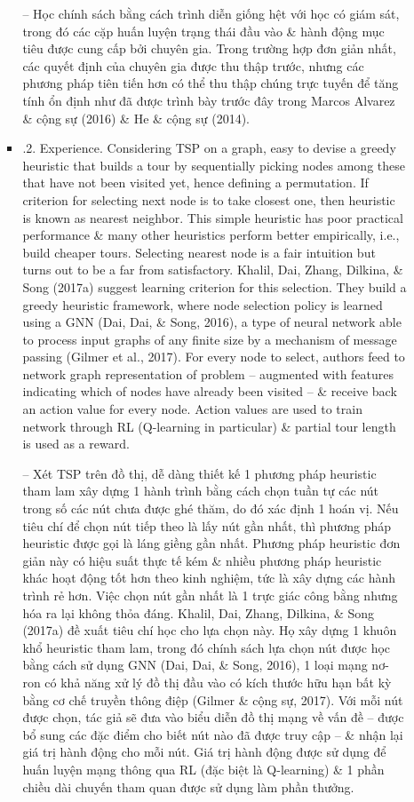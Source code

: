 \documentclass{article}
\begin{document}
\begin{itemize}
\begin{itemize}
\begin{itemize}
            -- Học chính sách bằng cách trình diễn giống hệt với học có giám sát, trong đó các cặp huấn luyện trạng thái đầu vào \& hành động mục tiêu được cung cấp bởi chuyên gia. Trong trường hợp đơn giản nhất, các quyết định của chuyên gia được thu thập trước, nhưng các phương pháp tiên tiến hơn có thể thu thập chúng trực tuyến để tăng tính ổn định như đã được trình bày trước đây trong Marcos Alvarez \& cộng sự (2016) \& He \& cộng sự (2014).
            \item {.2. Experience.} Considering TSP on a graph, easy to devise a greedy heuristic that builds a tour by sequentially picking nodes among these that have not been visited yet, hence defining a permutation. If criterion for selecting next node is to take closest one, then heuristic is known as nearest neighbor. This simple heuristic has poor practical performance \& many other heuristics perform better empirically, i.e., build cheaper tours. Selecting nearest node is a fair intuition but turns out to be a far from satisfactory. Khalil, Dai, Zhang, Dilkina, \& Song (2017a) suggest learning criterion for this selection. They build a greedy heuristic framework, where node selection policy is learned using a GNN (Dai, Dai, \& Song, 2016), a type of neural network able to process input graphs of any finite size by a mechanism of message passing (Gilmer et al., 2017). For every node to select, authors feed to network graph representation of problem -- augmented with features indicating which of nodes have already been visited -- \& receive back an action value for every node. Action values are used to train network through RL (Q-learning in particular) \& partial tour length is used as a reward.

            -- Xét TSP trên đồ thị, dễ dàng thiết kế 1 phương pháp heuristic tham lam xây dựng 1 hành trình bằng cách chọn tuần tự các nút trong số các nút chưa được ghé thăm, do đó xác định 1 hoán vị. Nếu tiêu chí để chọn nút tiếp theo là lấy nút gần nhất, thì phương pháp heuristic được gọi là láng giềng gần nhất. Phương pháp heuristic đơn giản này có hiệu suất thực tế kém \& nhiều phương pháp heuristic khác hoạt động tốt hơn theo kinh nghiệm, tức là xây dựng các hành trình rẻ hơn. Việc chọn nút gần nhất là 1 trực giác công bằng nhưng hóa ra lại không thỏa đáng. Khalil, Dai, Zhang, Dilkina, \& Song (2017a) đề xuất tiêu chí học cho lựa chọn này. Họ xây dựng 1 khuôn khổ heuristic tham lam, trong đó chính sách lựa chọn nút được học bằng cách sử dụng GNN (Dai, Dai, \& Song, 2016), 1 loại mạng nơ-ron có khả năng xử lý đồ thị đầu vào có kích thước hữu hạn bất kỳ bằng cơ chế truyền thông điệp (Gilmer \& cộng sự, 2017). Với mỗi nút được chọn, tác giả sẽ đưa vào biểu diễn đồ thị mạng về vấn đề -- được bổ sung các đặc điểm cho biết nút nào đã được truy cập -- \& nhận lại giá trị hành động cho mỗi nút. Giá trị hành động được sử dụng để huấn luyện mạng thông qua RL (đặc biệt là Q-learning) \& 1 phần chiều dài chuyến tham quan được sử dụng làm phần thưởng.


\end{itemize}
\end{itemize}
\end{itemize}
\end{document}
